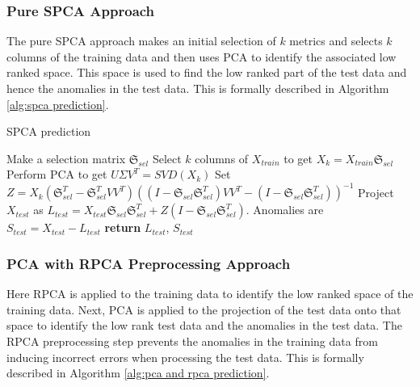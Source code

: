 \documentclass[conference]{IEEEtran}
\begin{document}
\subsubsection{Pure SPCA Approach}
The pure SPCA approach makes an initial selection of $k$ metrics and selects $k$ columns of the training data and then uses PCA to identify the associated low ranked space.  This space is used to find the low ranked part of the test data and hence the anomalies in the test data. This is formally described in Algorithm \ref{alg:spca prediction}.
\begin{algorithm}
\caption{SPCA prediction}\label{alg:spca prediction}
\begin{algorithmic}[1]
\State Make a selection matrix $\mathfrak{S}_{sel}$
\State Select $k$ columns of $X_{train}$ to get $X_k = X_{train} \mathfrak{S}_{sel}$
\State Perform PCA to get $U \Sigma V^T = SVD(X_k)$
\State Set $Z = X_k (\mathfrak{S}_{sel}^T - \mathfrak{S}_{sel}^T V V^T)  ((I-\mathfrak{S}_{sel} \mathfrak{S}_{sel}^T)V V^T - (I-\mathfrak{S}_{sel} \mathfrak{S}_{sel}^T))^{-1}$
\State Project $X_{test}$ as $L_{test} = X_{test} \mathfrak{S}_{sel} \mathfrak{S}_{sel}^T + Z (I-\mathfrak{S}_{sel} \mathfrak{S}_{sel}^T)$.
\State Anomalies are $S_{test} = X_{test} - L_{test}$
\State \textbf{return} $L_{test}$, $S_{test}$
\EndProcedure
\end{algorithmic}
\end{algorithm}

\subsubsection{PCA with RPCA Preprocessing Approach}
Here RPCA is applied to the training data to identify the low ranked space of the training data.  Next, PCA is applied to the projection of the test data onto that space to identify the low rank test data and the anomalies in the test data.  The RPCA preprocessing step prevents the anomalies in the training data from inducing incorrect errors when processing the test data.  This is formally described in Algorithm \ref{alg:pca and rpca prediction}.
\end{document}
